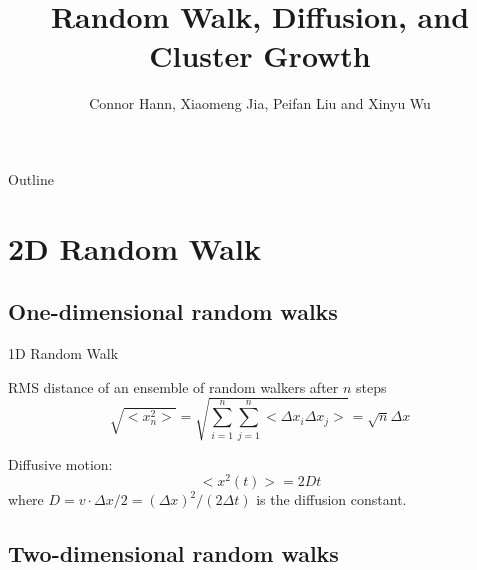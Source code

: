 \documentclass{beamer}
\title{Random Walk, Diffusion, and Cluster Growth}
\author{Connor Hann, Xiaomeng Jia, Peifan Liu and Xinyu Wu}
\institute[] {Physics Department, Duke University}
\begin{document}
\begin{frame}
  \titlepage
\end{frame}

\begin{frame}{Outline}
  \tableofcontents
\end{frame}


\section{2D Random Walk}


\subsection{One-dimensional random walks}

\begin{frame}{1D Random Walk}

RMS distance of an ensemble of random walkers after $n$ steps
\begin{equation}
	\sqrt{<x_n^2>} = \sqrt{\sum\limits_{i=1}^{n}\sum\limits_{j=1}^{n}<\Delta x_i\Delta x_j>} = \sqrt{n}\Delta x
\end{equation} 

Diffusive motion:
\begin{equation}
	<x^2(t)> = 2Dt
\end{equation}
where $D = v\cdot\Delta x/2 = (\Delta x)^2/(2\Delta t)$ is the diffusion constant.

\end{frame}

\subsection{Two-dimensional random walks}
\end{document}
